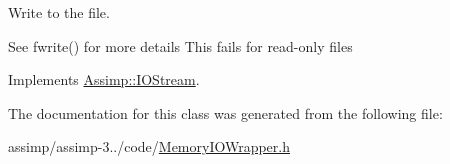 Write to the file. 

See fwrite() for more details This fails for read-\/only files 

Implements \hyperlink{class_assimp_1_1_i_o_stream_ad0ca4aae1b8c4d00db391ac3a4171f7b}{Assimp\+::\+I\+O\+Stream}.



The documentation for this class was generated from the following file\+:\begin{DoxyCompactItemize}
\item 
assimp/assimp-\/3../code/\hyperlink{_memory_i_o_wrapper_8h}{Memory\+I\+O\+Wrapper.\+h}\end{DoxyCompactItemize}
